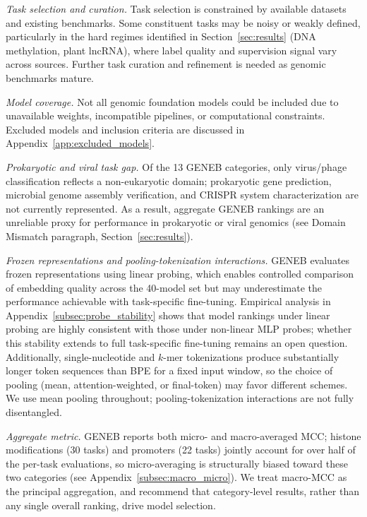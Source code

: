 \documentclass{article}
\theoremstyle{plain}
\theoremstyle{definition}
\theoremstyle{remark}
\begin{document}
\textit{Task selection and curation.} Task selection is constrained
by available datasets and existing benchmarks. Some constituent tasks
may be noisy or weakly defined, particularly in the hard regimes
identified in Section~\ref{sec:results} (DNA methylation, plant
lncRNA), where label quality and supervision signal vary across
sources. Further task curation and refinement is needed as genomic
benchmarks mature.

\textit{Model coverage.} Not all genomic foundation models could be
included due to unavailable weights, incompatible pipelines, or
computational constraints. Excluded models and inclusion criteria are
discussed in Appendix~\ref{app:excluded_models}.

\textit{Prokaryotic and viral task gap.} Of the 13 GENEB categories,
only virus/phage classification reflects a non-eukaryotic domain;
prokaryotic gene prediction, microbial genome assembly verification,
and CRISPR system characterization are not currently represented. As
a result, aggregate GENEB rankings are an unreliable proxy for
performance in prokaryotic or viral genomics (see Domain Mismatch
paragraph, Section~\ref{sec:results}).

\textit{Frozen representations and pooling-tokenization interactions.}
GENEB evaluates frozen representations using linear probing, which
enables controlled comparison of embedding quality across the
40-model set but may underestimate the performance achievable with
task-specific fine-tuning. Empirical analysis in
Appendix~\ref{subsec:probe_stability} shows that model rankings under
linear probing are highly consistent with those under non-linear MLP
probes; whether this stability extends to full task-specific
fine-tuning remains an open question. Additionally, single-nucleotide
and $k$-mer tokenizations produce substantially longer token
sequences than BPE for a fixed input window, so the choice of pooling
(mean, attention-weighted, or final-token) may favor different
schemes. We use mean pooling throughout; pooling-tokenization
interactions are not fully disentangled.

\textit{Aggregate metric.} GENEB reports both micro- and
macro-averaged MCC; histone modifications (30 tasks) and promoters
(22 tasks) jointly account for over half of the per-task evaluations,
so micro-averaging is structurally biased toward these two categories
(see Appendix~\ref{subsec:macro_micro}). We treat macro-MCC as the
principal aggregation, and recommend that category-level results,
rather than any single overall ranking, drive model selection.
\end{document}

